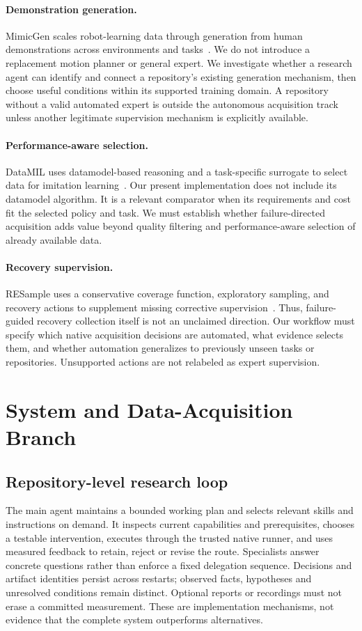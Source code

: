 \documentclass[10pt,twocolumn,letterpaper]{article}
\begin{document}
\paragraph{Demonstration generation.}
MimicGen scales robot-learning data through generation from human demonstrations
across environments and tasks~\cite{mimicgen}. We do not introduce a replacement
motion planner or general expert. We investigate whether a research agent can
identify and connect a repository's existing generation mechanism, then choose
useful conditions within its supported training domain. A repository without a
valid automated expert is outside the autonomous acquisition track unless another
legitimate supervision mechanism is explicitly available.

\paragraph{Performance-aware selection.}
DataMIL uses datamodel-based reasoning and a task-specific surrogate to select
data for imitation learning~\cite{datamil}. Our present implementation does not
include its datamodel algorithm. It is a relevant comparator when its requirements
and cost fit the selected policy and task. We must establish whether failure-directed
acquisition adds value beyond quality filtering and performance-aware selection
of already available data.

\paragraph{Recovery supervision.}
RESample uses a conservative coverage function, exploratory sampling, and recovery
actions to supplement missing corrective supervision~\cite{resample}. Thus,
failure-guided recovery collection itself is not an unclaimed direction. Our
workflow must specify which native acquisition decisions are automated, what
evidence selects them, and whether automation generalizes to previously unseen
tasks or repositories. Unsupported actions are not relabeled as expert supervision.

\section{System and Data-Acquisition Branch}
\subsection{Repository-level research loop}
The main agent maintains a bounded working plan and selects relevant skills and
instructions on demand. It inspects current capabilities and prerequisites,
chooses a testable intervention, executes through the trusted native runner, and
uses measured feedback to retain, reject or revise the route. Specialists answer
concrete questions rather than enforce a fixed delegation sequence. Decisions
and artifact identities persist across restarts; observed facts, hypotheses and
unresolved conditions remain distinct. Optional reports or recordings must not
erase a committed measurement. These are implementation mechanisms, not evidence
that the complete system outperforms alternatives.
\end{document}
